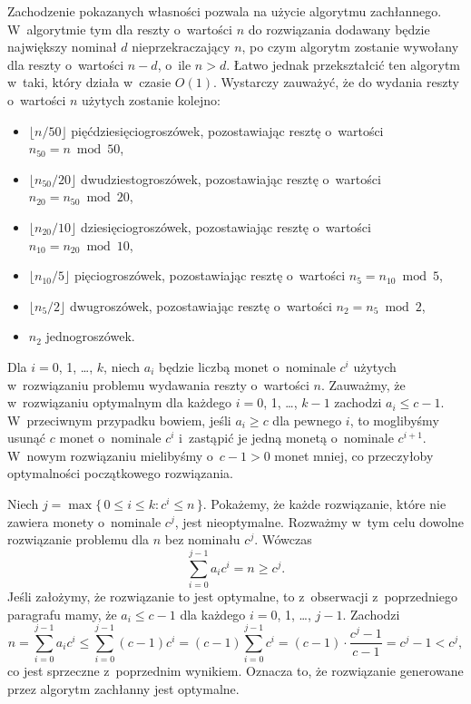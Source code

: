 Zachodzenie pokazanych własności pozwala na użycie algorytmu zachłannego.
W~algorytmie tym dla reszty o~wartości $n$ do rozwiązania dodawany będzie największy nominał $d$ nieprzekraczający $n$, po czym algorytm zostanie wywołany dla reszty o~wartości $n-d$, o~ile $n>d$.
Łatwo jednak przekształcić ten algorytm w~taki, który działa w~czasie $O(1)$.
Wystarczy zauważyć, że do wydania reszty o~wartości $n$ użytych zostanie kolejno:
\begin{itemize}
	\item $\lfloor n/50\rfloor$ pięćdziesięciogroszówek, pozostawiając resztę o~wartości $n_{50}=n\bmod50$,
	\item $\lfloor n_{50}/20\rfloor$ dwudziestogroszówek, pozostawiając resztę o~wartości $n_{20}=n_{50}\bmod20$,
	\item $\lfloor n_{20}/10\rfloor$ dziesięciogroszówek, pozostawiając resztę o~wartości $n_{10}=n_{20}\bmod10$,
	\item $\lfloor n_{10}/5\rfloor$ pięciogroszówek, pozostawiając resztę o~wartości $n_5=n_{10}\bmod5$,
	\item $\lfloor n_5/2\rfloor$ dwugroszówek, pozostawiając resztę o~wartości $n_2=n_5\bmod2$,
	\item $n_2$ jednogroszówek.
\end{itemize}

\subproblem %
Dla $i=0$, 1, \dots, $k$, niech $a_i$ będzie liczbą monet o~nominale $c^i$ użytych w~rozwiązaniu problemu wydawania reszty o~wartości $n$.
Zauważmy, że w~rozwiązaniu optymalnym dla każdego $i=0$, 1, \dots, $k-1$ zachodzi $a_i\le c-1$.
W~przeciwnym przypadku bowiem, jeśli $a_i\ge c$ dla pewnego $i$, to moglibyśmy usunąć $c$ monet o~nominale $c^i$ i~zastąpić je jedną monetą o~nominale $c^{i+1}$.
W~nowym rozwiązaniu mielibyśmy o~$c-1>0$ monet mniej, co przeczyłoby optymalności początkowego rozwiązania.

Niech $j=\max\{\,0\le i\le k:c^i\le n\,\}$.
Pokażemy, że każde rozwiązanie, które nie zawiera monety o~nominale $c^j$, jest nieoptymalne.
Rozważmy w~tym celu dowolne rozwiązanie problemu dla $n$ bez nominału $c^j$.
Wówczas
\[
    \sum_{i=0}^{j-1}a_ic^i = n \ge c^j.
\]
Jeśli założymy, że rozwiązanie to jest optymalne, to z~obserwacji z~poprzedniego paragrafu mamy, że $a_i\le c-1$ dla każdego $i=0$, 1, \dots, $j-1$.
Zachodzi
\[
	n = \sum_{i=0}^{j-1}a_ic^i \le \sum_{i=0}^{j-1}(c-1)c^i = (c-1)\sum_{i=0}^{j-1}c^i = (c-1)\cdot\frac{c^j-1}{c-1} = c^j-1 < c^j,
\]
co jest sprzeczne z~poprzednim wynikiem.
Oznacza to, że rozwiązanie generowane przez algorytm zachłanny jest optymalne.

